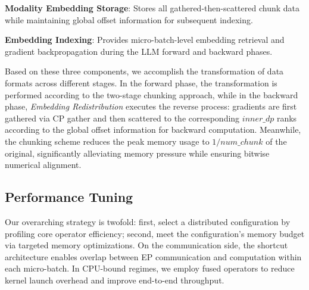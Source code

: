 \documentclass{article}
\begin{document}


\textbf{Modality Embedding Storage}: Stores all gathered-then-scattered chunk data while maintaining global offset information for subsequent indexing.

\textbf{Embedding Indexing}: Provides micro-batch-level embedding retrieval and gradient backpropagation during the LLM forward and backward phases.

Based on these three components, we accomplish the transformation of data formats across different stages. In the forward phase, the transformation is performed according to the two-stage chunking approach, while in the backward phase, \textit{Embedding Redistribution} executes the reverse process: gradients are first gathered via CP gather and then scattered to the corresponding \(inner\_dp\) ranks according to the global offset information for backward computation. Meanwhile, the chunking scheme reduces the peak memory usage to \(1/num\_chunk\) of the original, significantly alleviating memory pressure while ensuring bitwise numerical alignment.


\subsection{Performance Tuning}
Our overarching strategy is twofold: first, select a distributed configuration by profiling core operator efficiency; second, meet the configuration's memory budget via targeted memory optimizations. On the communication side, the shortcut architecture enables overlap between EP communication and computation within each micro-batch. In CPU-bound regimes, we employ fused operators to reduce kernel launch overhead and improve end-to-end throughput.
\end{document}
